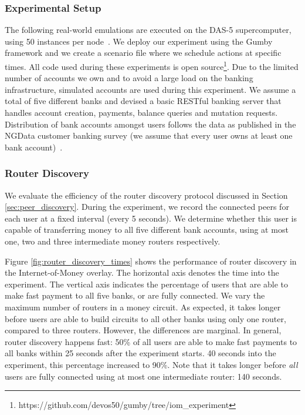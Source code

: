 \subsubsection*{Experimental Setup}
The following real-world emulations are executed on the DAS-5 supercomputer, using 50 instances per node~\cite{bal2016medium}.
We deploy our experiment using the Gumby framework and we create a scenario file where we schedule actions at specific times.
All code used during these experiments is open source\footnote{https://github.com/devos50/gumby/tree/iom\_experiment}.
Due to the limited number of accounts we own and to avoid a large load on the banking infrastructure, simulated accounts are used during this experiment.
We assume a total of five different banks and devised a basic RESTful banking server that handles account creation, payments, balance queries and mutation requests.
Distribution of bank accounts amongst users follows the data as published in the NGData customer banking survey (we assume that every user owns at least one bank account)~\cite{ngdata2014consumer}.

\subsubsection*{Router Discovery}
\label{sec:router_discovery_evaluation}
We evaluate the efficiency of the router discovery protocol discussed in Section \ref{sec:peer_discovery}.
During the experiment, we record the connected peers for each user at a fixed interval (every 5 seconds).
We determine whether this user is capable of transferring money to all five different bank accounts, using at most one, two and three intermediate money routers respectively.

Figure \ref{fig:router_discovery_times} shows the performance of router discovery in the Internet-of-Money overlay.
The horizontal axis denotes the time into the experiment.
The vertical axis indicates the percentage of users that are able to make fast payment to all five banks, or are fully connected.
We vary the maximum number of routers in a money circuit.
As expected, it takes longer before users are able to build circuits to all other banks using only one router, compared to three routers.
However, the differences are marginal.
In general, router discovery happens fast: 50\% of all users are able to make fast payments to all banks within 25 seconds after the experiment starts.
40 seconds into the experiment, this percentage increased to 90\%.
Note that it takes longer before \emph{all} users are fully connected using at most one intermediate router: 140 seconds.

